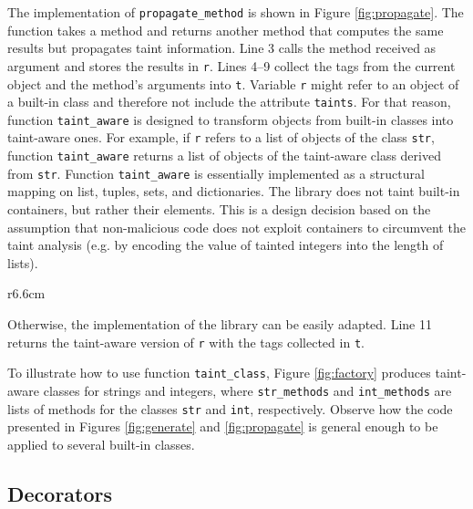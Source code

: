 \documentclass[oribibl]{llncs}
\newcommand{\nametklass}{taint-aware }
\newcommand{\nameTklass}{Taint-aware }
\begin{document}
The implementation of \texttt{propagate\_method} is shown in Figure
\ref{fig:propagate}. The function takes a method and returns another
method that computes the same results but propagates taint information. Line 3
calls the method received as argument and stores the results in 
\texttt{r}. 
Lines 4--9 collect the tags from the current object and 
the method's arguments into \texttt{t}. 
Variable \texttt{r} 
might refer to an object of a built-in class and
therefore not include the attribute \texttt{taints}. For that reason, 
function \texttt{taint\_aware} is designed to 
transform objects from built-in classes  
into \nametklass ones. 
For example, if \texttt{r} refers
to a list of objects of the class \texttt{str}, function \texttt{taint\_aware} returns  
a list of objects of the \nametklass class 
derived from \texttt{str}. 
Function \texttt{taint\_aware} 
is essentially implemented as a structural mapping on list, tuples,
sets, and dictionaries. 
The library does not
taint built-in containers, but rather their elements. This is a design decision 
based on the assumption that non-malicious code does not exploit
containers to circumvent the taint analysis (e.g. by 
encoding the value of tainted integers into 
the length of lists).
\begin{wrapfigure}{r}{6.6cm}
\vspace{-20pt}
{\small{

\caption{\label{fig:factory} \nameTklass classes for strings and
  integers}
}}
\vspace{-20pt}
\end{wrapfigure}
Otherwise, the implementation of the library can be easily adapted.
Line 11 returns the taint-aware version of \texttt{r} 
with the tags collected in \texttt{t}. 



  
To illustrate how to use  function \texttt{taint\_class}, Figure \ref{fig:factory} 
produces \nametklass classes for strings and integers, where 
\texttt{str\_methods} and \texttt{int\_methods} are lists 
of methods for the classes \texttt{str} and
\texttt{int}, respectively. Observe how the code presented in Figures
\ref{fig:generate} and \ref{fig:propagate} is general enough to be
applied to several built-in classes.
  

\subsection{Decorators}
\end{document}
